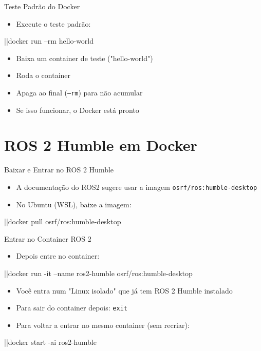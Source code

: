 \begin{frame}[fragile]{Teste Padrão do Docker}
\begin{itemize}
  \item Execute o teste padrão:
\end{itemize}

\begin{bashprompt}
|\nocopy{\textdollar\ }|docker run --rm hello-world
\end{bashprompt}

\begin{itemize}
  \item Baixa um container de teste ("hello-world")
  \item Roda o container
  \item Apaga ao final (\texttt{--rm}) para não acumular
  \item Se isso funcionar, o Docker está pronto
\end{itemize}
\end{frame}

\section{ROS 2 Humble em Docker}

\begin{frame}[fragile]{Baixar e Entrar no ROS 2 Humble}
\begin{itemize}
  \item A documentação do ROS2 sugere usar a imagem \texttt{osrf/ros:humble-desktop}
  \item No Ubuntu (WSL), baixe a imagem:
\end{itemize}

\begin{bashprompt}
|\nocopy{\textdollar\ }|docker pull osrf/ros:humble-desktop
\end{bashprompt}
\end{frame}

\begin{frame}[fragile]{Entrar no Container ROS 2}
\begin{itemize}
  \item Depois entre no container:
\end{itemize}

\begin{bashprompt}
|\nocopy{\textdollar\ }|docker run -it --name ros2-humble osrf/ros:humble-desktop
\end{bashprompt}

\begin{itemize}
  \item Você entra num "Linux isolado" que já tem ROS 2 Humble instalado
  \item Para sair do container depois: \texttt{exit}
  \item Para voltar a entrar no mesmo container (sem recriar):
\end{itemize}

\begin{bashprompt}
|\nocopy{\textdollar\ }|docker start -ai ros2-humble
\end{bashprompt}
\end{frame}


